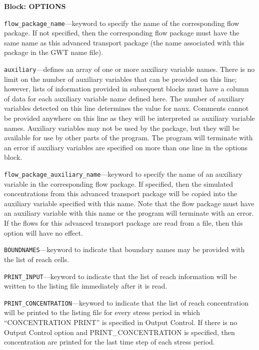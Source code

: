 
\item \textbf{Block: OPTIONS}

\begin{description}
\item \texttt{flow\_package\_name}---keyword to specify the name of the corresponding flow package.  If not specified, then the corresponding flow package must have the same name as this advanced transport package (the name associated with this package in the GWT name file).

\item \texttt{auxiliary}---defines an array of one or more auxiliary variable names.  There is no limit on the number of auxiliary variables that can be provided on this line; however, lists of information provided in subsequent blocks must have a column of data for each auxiliary variable name defined here.   The number of auxiliary variables detected on this line determines the value for naux.  Comments cannot be provided anywhere on this line as they will be interpreted as auxiliary variable names.  Auxiliary variables may not be used by the package, but they will be available for use by other parts of the program.  The program will terminate with an error if auxiliary variables are specified on more than one line in the options block.

\item \texttt{flow\_package\_auxiliary\_name}---keyword to specify the name of an auxiliary variable in the corresponding flow package.  If specified, then the simulated concentrations from this advanced transport package will be copied into the auxiliary variable specified with this name.  Note that the flow package must have an auxiliary variable with this name or the program will terminate with an error.  If the flows for this advanced transport package are read from a file, then this option will have no effect.

\item \texttt{BOUNDNAMES}---keyword to indicate that boundary names may be provided with the list of reach cells.

\item \texttt{PRINT\_INPUT}---keyword to indicate that the list of reach information will be written to the listing file immediately after it is read.

\item \texttt{PRINT\_CONCENTRATION}---keyword to indicate that the list of reach concentration will be printed to the listing file for every stress period in which ``CONCENTRATION PRINT'' is specified in Output Control.  If there is no Output Control option and PRINT\_CONCENTRATION is specified, then concentration are printed for the last time step of each stress period.


\end{description}
